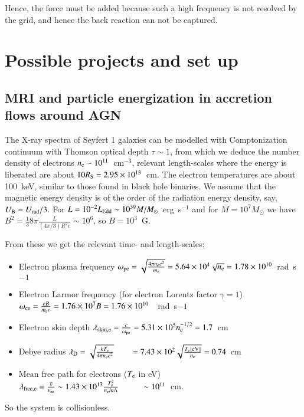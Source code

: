 \documentclass{aa}
\begin{document}
Hence, the force must be added because such a high frequency is not resolved by the grid, and hence the back reaction can not be captured.




\section{Possible projects and set up}

\subsection{MRI and particle energization in accretion flows around AGN} 

The X-ray spectra of Seyfert 1 galaxies can be modelled with Comptonization continuum with Thomson optical depth 
$\tau \sim 1$, from which we deduce the number density of electrons $n_{\rm e}\sim 10^{11}$~cm$^{-3}$, relevant 
length-scales where the energy is liberated are about $10R_{\rm S}=2.95\times10^{13}$~cm.
The electron temperatures are about 100~keV, similar to those found in black hole binaries.
We assume that the magnetic energy density is of the order of the radiation energy density, say, $U_{\rm B}=U_{\rm rad}/3$. 
For $L=10^{-2}L_{\rm Edd}\sim10^{39}M/M_{\odot}$~erg~s$^{-1}$ and for $M=10^7M_{\odot}$ we have 
$B^2 = \frac {1}{3} 8\pi \frac {L}{(4\pi/3) R^2 c}\sim 10^6$, so $B=10^3$~G.

From these we get the relevant time- and length-scales:
\begin{itemize}
\item Electron plasma frequency 
$\omega_{\rm pe} = \sqrt{ \frac{4\pi n_{\rm e} e^2}{m_{\rm e}} } 
                 = 5.64 \times 10^4 \sqrt{n_{\rm e}}=1.78\times10^{10}$~rad~s${-1}$
\item Electron Larmor frequency (for electron Lorentz factor $\gamma=1$)
$\omega_{\rm ce} = \frac {eB}{m_{\rm e}c} = 1.76 \times 10^7 B = 1.76\times10^{10}$~~rad~s${-1}$
\item Electron skin depth
$\lambda_{\rm skin,e} = \frac {c}{\omega_{\rm pe}} = 5.31\times10^5 n_{\rm e}^{-1/2} = 1.7$~cm
\item Debye radius
$\lambda_{\rm D} = \sqrt{ \frac {k T_{\rm e}}{4\pi n_{\rm e} e^2} } 
                 = 7.43\times10^2 \sqrt{ \frac {T_{\rm e} {\rm[eV]}}{n_{\rm e}}} = 0.74$~cm
\item Mean free path for electrons ($T_{\rm e}$ in eV)
$\lambda_{\rm free,e} = \frac {\overline{v}}{\nu_{\rm ee}} \sim 1.43\times 10^{13} \frac {T_{\rm e}^2}{n_{\rm e} ln\Lambda} 
                      \sim 10^{11}$~cm.
\end{itemize}
So the system is collisionless.
\end{document}
